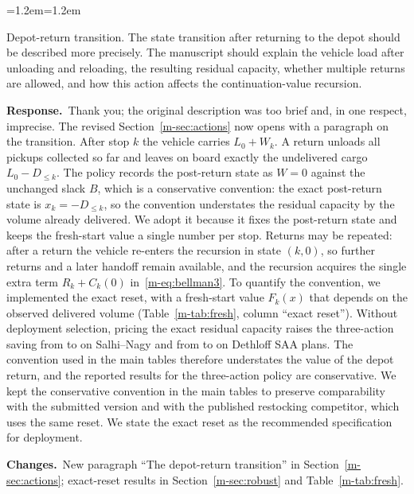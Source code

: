 \documentclass[11pt]{article}
\newenvironment{comment}{\par\medskip\noindent\color{rev}\itshape
  \begin{list}{}{\leftmargin=1.2em\rightmargin=1.2em}\item[]}%
  {\end{list}\par}
\newcommand{\resp}{\par\noindent\textbf{Response.}\ }
\newcommand{\chg}{\par\noindent\textbf{Changes.}\ }
\newcommand{\sref}[1]{Section~\ref{m-#1}}
\newcommand{\tref}[1]{Table~\ref{m-#1}}
\begin{document}
\begin{comment}
Depot-return transition. The state transition after returning to the
depot should be described more precisely. The manuscript should explain
the vehicle load after unloading and reloading, the resulting residual
capacity, whether multiple returns are allowed, and how this action
affects the continuation-value recursion.
\end{comment}
\resp Thank you; the original description was too brief and, in one
respect, imprecise. The revised \sref{sec:actions} now opens with a
paragraph on the transition. After stop $k$ the vehicle carries
$L_0 + W_k$. A return unloads all pickups collected so far and leaves
on board exactly the undelivered cargo $L_0 - D_{\le k}$. The policy
records the post-return state as $W = 0$ against the unchanged slack
$B$, which is a conservative convention: the exact post-return state is
$x_k = -D_{\le k}$, so the convention understates the residual capacity
by the volume already delivered. We adopt it because it fixes the
post-return state and keeps the fresh-start value a single number per
stop. Returns may be repeated: after a return the vehicle re-enters the
recursion in state $(k,0)$, so further returns and a later handoff
remain available, and the recursion acquires the single extra term
$R_k + C_k(0)$ in~\eqref{m-eq:bellman3}. To quantify the convention, we
implemented the exact reset, with a fresh-start value $F_k(x)$ that
depends on the observed delivered volume (\tref{tab:fresh}, column
``exact reset''). Without deployment selection, pricing the exact
residual capacity raises the three-action saving from \frSalhiThree{} to
\frSalhiExact{} on Salhi--Nagy and from \frDethThree{} to \frDethExact{}
on Dethloff \textsc{SAA} plans. The convention used in the main tables
therefore understates the value of the depot return, and the reported
results for the three-action policy are conservative. We kept the
conservative convention in the main tables to preserve comparability
with the submitted version and with the published restocking competitor,
which uses the same reset. We state the exact reset as the recommended
specification for deployment.
\chg New paragraph ``The depot-return transition'' in
\sref{sec:actions}; exact-reset results in \sref{sec:robust} and
\tref{tab:fresh}.
\end{document}
